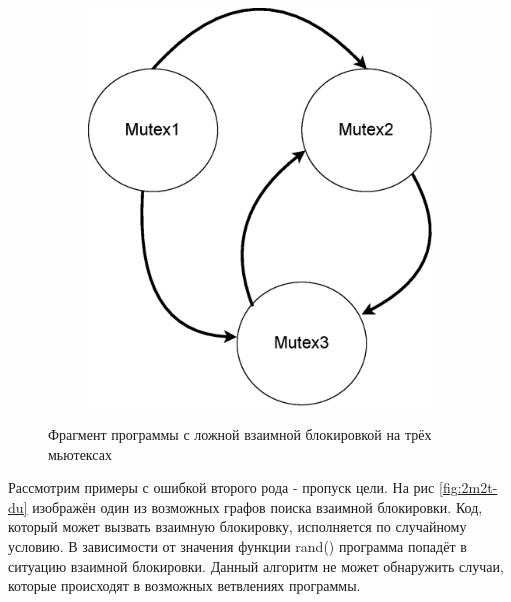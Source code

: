 \begin{figure}[htbp]
    \centering
    \begin{subfigure}[h]{0.4\textwidth}
        \centering
        
    \end{subfigure}
    \hfill
    \begin{subfigure}[h]{0.4\textwidth}
        \centering
        \includegraphics[width=\textwidth]{inc/chapter-first/3m2t-du.eps}
    \end{subfigure}
    \caption{Фрагмент программы с ложной взаимной блокировкой на трёх мьютексах}
    \label{fig:3m2t-du}
\end{figure}

Рассмотрим примеры с ошибкой второго рода - пропуск цели. На рис \ref{fig:2m2t-du} изображён один из возможных графов поиска взаимной блокировки. Код, который может вызвать взаимную блокировку, исполняется по случайному условию. В зависимости от значения функции rand() программа попадёт в ситуацию взаимной блокировки. Данный алгоритм не может обнаружить случаи, которые происходят в возможных ветвлениях программы.


